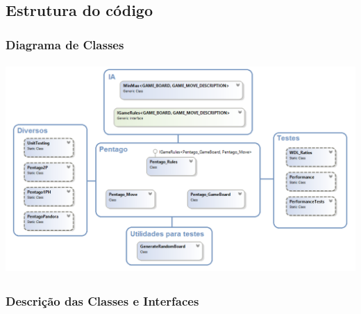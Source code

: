 \subsection{Estrutura do código}

\subsubsection{Diagrama de Classes}

\begin{table}[H]
\centering
\includegraphics[height=8cm]{images/ClassDiagram1.png}
\end{table}


\newpage
\subsubsection{Descrição das Classes e Interfaces}

